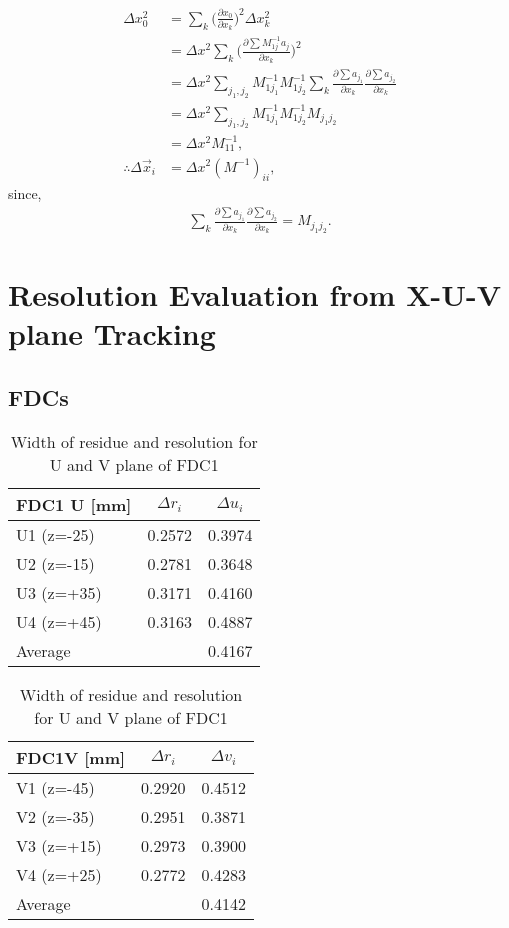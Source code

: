 \begin{align}
\Delta x^2_0 &= \sum_{k}\bigg( \frac{\partial x_0}{\partial x_k} \bigg)^2 \Delta x_k^2 \\
            &= \Delta x^2 \sum_{k} \bigg( \frac{\partial \sum M^{-1}_{1j} a_j}{\partial x_k}\bigg)^2\\
            &= \Delta x^2 \sum_{j_1,j_2} M^{-1}_{1j_1} M^{-1}_{1j_2} \sum_k \frac{\partial\sum a_{j_1}}{\partial x_k} \frac{\partial \sum a_{j_2}}{\partial x_k}   \\
            &= \Delta x^2 \sum_{j_1,j_2} M^{-1}_{1j_1} M^{-1}_{1j_2} M_{j_1j_2}\\
            &= \Delta x^2 M^{-1}_{11},\\ 
\therefore \Delta \vec{x}_i &= \Delta x^2 (M^{-1})_{ii},
\end{align}
since,
\begin{align}
    \sum_k \frac{\partial \sum a_{j_1}}{\partial x_k} \frac{\partial \sum a_{j_2}}{\partial x_k} = M_{j_1j_2}.
\end{align}
\clearpage

\section{Resolution Evaluation from X-U-V plane Tracking}

\subsection{FDCs}

\begin{table}[h]
    \centering
    \begin{tabular}{l|cc}
    \hline
      FDC1 U [mm] & $\Delta r_i$ & $\Delta u_i$  \\
    \hline
        U1 (z=-25) &  0.2572 & 0.3974       \\
        U2 (z=-15) &  0.2781 & 0.3648      \\
        U3 (z=+35) &  0.3171 & 0.4160     \\
        U4 (z=+45) &  0.3163 & 0.4887      \\
    \hline
    Average &        &   0.4167 \\
    \hline
    \end{tabular}
    \begin{tabular}{l|cc}
    \hline
      FDC1V [mm] & $\Delta r_i$ & $\Delta v_i$ \\
    \hline
        V1 (z=-45) & 0.2920 & 0.4512 \\
        V2 (z=-35) & 0.2951 & 0.3871 \\
        V3 (z=+15) & 0.2973 & 0.3900 \\
        V4 (z=+25) & 0.2772 & 0.4283 \\
    \hline
    Average &        & 0.4142 \\
    \hline
    \end{tabular}
    \caption{Width of residue and resolution for U and V plane of FDC1}
\end{table}

